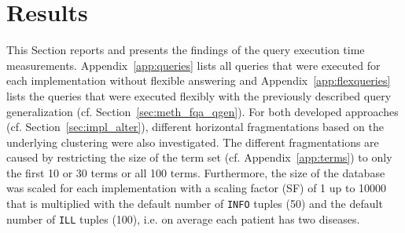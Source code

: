 
\section{Results}
\label{sec:res}

This Section reports and presents the findings of the query execution time measurements. Appendix~\ref{app:queries} lists all queries that were executed
for each implementation without flexible answering and Appendix~\ref{app:flexqueries} lists the queries that were executed flexibly with the previously described
query generalization (cf. Section~\ref{sec:meth_fqa_qgen}). For both developed approaches (cf. Section~\ref{sec:impl_alter}), different horizontal fragmentations
based on the underlying clustering were also investigated. The different fragmentations are caused by restricting the size of the term set 
(cf. Appendix~\ref{app:terms}) to only the first 10 or 30 terms or all 100 terms. Furthermore, the size of the database was scaled for each implementation with
a scaling factor (SF) of 1 up to 10000 that is multiplied with the default number of \verb!INFO! tuples (50) and the default number of \verb!ILL! tuples (100),
i.e. on average each patient has two diseases.

